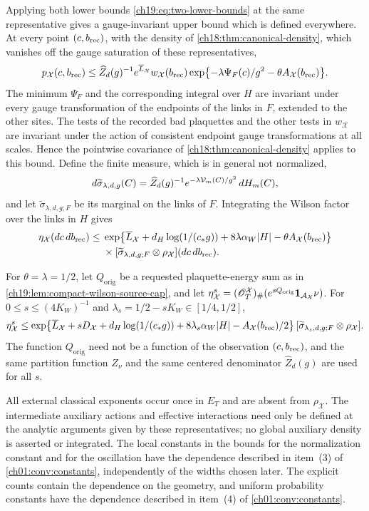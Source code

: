 \begin{theorem}
Applying both lower bounds \eqref{ch19:eq:two-lower-bounds} at the same representative gives a gauge-invariant upper bound which is defined everywhere. At every point $(c,b_{\mathrm{rec}})$, with the density of \cref{ch18:thm:canonical-density}, which vanishes off the gauge saturation of these representatives,
\[
 p_{\mathcal X}(c,b_{\mathrm{rec}})\le\widehat Z_d(g)^{-1}e^{\overline L_{\mathcal X}}w_{\mathcal X}(b_{\mathrm{rec}})
 \exp\bigl\{-\lambda\Psi_F(c)/g^2-\theta A_{\mathcal X}(b_{\mathrm{rec}})\bigr\}.
\]
The minimum $\Psi_F$ and the corresponding integral over $H$ are invariant under every gauge transformation of the endpoints of the links in $F$, extended to the other sites. The tests of the recorded bad plaquettes and the other tests in $w_{\mathcal X}$ are invariant under the action of consistent endpoint gauge transformations at all scales. Hence the pointwise covariance of \cref{ch18:thm:canonical-density} applies to this bound. Define the finite measure, which is in general not normalized,
\[
 d\widetilde\sigma_{\lambda,d,g}(C)=\widehat Z_d(g)^{-1}e^{-\lambda\mathcal V_m(C)/g^2}\,dH_m(C),
\]
and let $\widetilde\sigma_{\lambda,d,g;F}$ be its marginal on the links of $F$. Integrating the Wilson factor over the links in $H$ gives
\[
 \begin{split}
 \eta_{\mathcal X}(dc\,db_{\mathrm{rec}})\le{}&
 \exp\bigl\{\overline L_{\mathcal X}+d_H\log(1/(c_*g))+8\lambda\alpha_W\lvert H\rvert-\theta A_{\mathcal X}(b_{\mathrm{rec}})\bigr\}\\
 &\times[\widetilde\sigma_{\lambda,d,g;F}\otimes\rho_{\mathcal X}](dc\,db_{\mathrm{rec}}).
 \end{split}
\]

For $\theta=\lambda=1/2$, let $Q_{\mathrm{orig}}$ be a requested plaquette-energy sum as in \cref{ch19:lem:compact-wilson-source-cap}, and let $\eta_{\mathcal X}^s=(\mathscr O_T^{\mathcal X})_\#(e^{sQ_{\mathrm{orig}}}\mathbf 1_{\mathcal A_{\mathcal X}}\nu)$. For $0\le s\le(4K_W)^{-1}$ and $\lambda_s=1/2-sK_W\in[1/4,1/2]$,
\begin{equation}\label{ch19:eq:completed-source-envelope}
 \eta_{\mathcal X}^s\le
 \exp\bigl\{\overline L_{\mathcal X}+sD_{\mathcal X}+d_H\log(1/(c_*g))+8\lambda_s\alpha_W\lvert H\rvert-A_{\mathcal X}(b_{\mathrm{rec}})/2\bigr\}
 \,[\widetilde\sigma_{\lambda_s,d,g;F}\otimes\rho_{\mathcal X}].
\end{equation}
The function $Q_{\mathrm{orig}}$ need not be a function of the observation $(c,b_{\mathrm{rec}})$, and the same partition function $Z_\nu$ and the same centered denominator $\widehat Z_d(g)$ are used for all $s$.

All external classical exponents occur once in $E_T$ and are absent from $\rho_{\mathcal X}$. The intermediate auxiliary actions and effective interactions need only be defined at the analytic arguments given by these representatives; no global auxiliary density is asserted or integrated. The local constants in the bounds for the normalization constant and for the oscillation have the dependence described in item~(3) of \cref{ch01:conv:constants}, independently of the widths chosen later. The explicit counts contain the dependence on the geometry, and uniform probability constants have the dependence described in item~(4) of \cref{ch01:conv:constants}.
\end{theorem}

